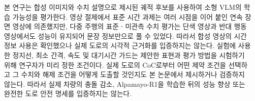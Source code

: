 본 연구는 합성 이미지와 수치 설명으로 제시된 궤적 후보를 사용하여 소형 VLM의 학습 가능성을 평가한다. 영상 절제에서 표준 시간 과제는 여러 시점을 이어 붙인 연속 장면 영상에 의존했지만, 다중 주행의 표준ㆍ미관측 수치 평가는 단색 영상과 반대 행동 영상에서도 성능이 유지되어 문장 정보만으로 풀 수 있었다. 따라서 합성 영상의 시간 정보 사용은 확인했으나 실제 도로의 시각적 근거화를 입증하지는 않는다. 실험에 사용한 정지선, 최소 간격, 속도 및 대기시간 가드는 제안한 표현과 평가 방법을 시험하기 위해 연구자가 미리 정한 조건이다. 실제 도로의 CoC로부터 어떤 제약 조건을 선택하고 그 수치와 해제 조건을 어떻게 도출할 것인지도 본 논문에서 제시하거나 검증하지 않는다. 따라서 실제 차량의 충돌 감소, Alpamayo-R1을 학습한 뒤의 성능 향상 또는 완전한 도로 안전 명세를 입증하지는 않는다.
